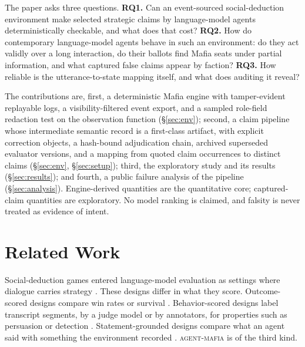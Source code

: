 \documentclass[11pt]{article}
\newcommand{\sys}{\textsc{agent-mafia}}
\begin{document}
The paper asks three questions. \textbf{RQ1.} Can an event-sourced social-deduction environment make selected strategic claims by language-model agents deterministically checkable, and what does that cost? \textbf{RQ2.} How do contemporary language-model agents behave in such an environment: do they act validly over a long interaction, do their ballots find Mafia seats under partial information, and what captured false claims appear by faction? \textbf{RQ3.} How reliable is the utterance-to-state mapping itself, and what does auditing it reveal?

The contributions are, first, a deterministic Mafia engine with tamper-evident replayable logs, a visibility-filtered event export, and a sampled role-field redaction test on the observation function (\S\ref{sec:env}); second, a claim pipeline whose intermediate semantic record is a first-class artifact, with explicit correction objects, a hash-bound adjudication chain, archived superseded evaluator versions, and a mapping from quoted claim occurrences to distinct claims (\S\ref{sec:env}, \S\ref{sec:setup}); third, the exploratory study and its results (\S\ref{sec:results}); and fourth, a public failure analysis of the pipeline (\S\ref{sec:analysis}). Engine-derived quantities are the quantitative core; captured-claim quantities are exploratory. No model ranking is claimed, and falsity is never treated as evidence of intent.

\section{Related Work}
\label{sec:related}

Social-deduction games entered language-model evaluation as settings where dialogue carries strategy \citep{xu2023werewolf,ogara2023hoodwinked,olson2026liecraft}. These designs differ in what they score. Outcome-scored designs compare win rates or survival \citep{bailis2024werewolf,costa2025minimafia}. Behavior-scored designs label transcript segments, by a judge model or by annotators, for properties such as persuasion or detection \citep{golechha2025amongus,agarwal2025wolf,bauer2026parliamentbench,kao2026hidden}. Statement-grounded designs compare what an agent said with something the environment recorded \citep{karpov2026mafiascope,kang2025miva}. \sys{} is of the third kind.
\end{document}
